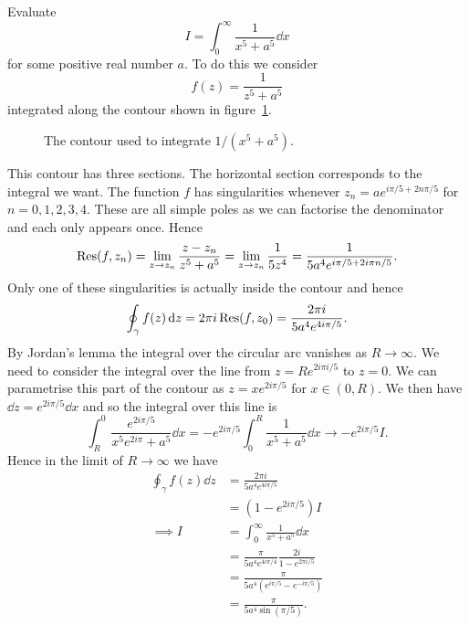 \documentclass{article}
\begin{document}
    Evaluate
    \[I = \int_{0}^{\infty} \frac{1}{x^5 + a^5}\dd{x}\]
    for some positive real number \(a\).
    To do this we consider
    \[f(z) = \frac{1}{z^5 + a^5}\]
    integrated along the contour shown in figure~\ref{fig:1/x^5 + a^5 contour}.
    \begin{figure}[ht]
        \centering
        \tikzexternalenable
        \tikzexternaldisable
        \caption{The contour used to integrate \(1/(x^5 + a^5)\).}
        \label{fig:1/x^5 + a^5 contour}
    \end{figure}
    This contour has three sections.
    The horizontal section corresponds to the integral we want.
    The function \(f\) has singularities whenever \(z_n = ae^{i\pi/5 + 2n\pi/5}\) for \(n = 0, 1, 2, 3, 4\).
    These are all simple poles as we can factorise the denominator and each only appears once.
    Hence
    \[\Res(f, z_n) = \lim_{z\to z_n} \frac{z - z_n}{z^5 + a^5} = \lim_{z\to z_n} \frac{1}{5z^4} = \frac{1}{5a^4e^{i\pi/5 + 2i\pi n/5}}.\]
    Only one of these singularities is actually inside the contour and hence
    \[\oint_{\gamma} f(z) \dd{z} = 2\pi i\Res(f, z_0) = \frac{2\pi i}{5a^4e^{4i\pi/5}}.\]
    By Jordan's lemma the integral over the circular arc vanishes as \(R\to\infty\).
    We need to consider the integral over the line from \(z = Re^{2i\pi i/5}\) to \(z = 0\).
    We can parametrise this part of the contour as \(z = xe^{2i\pi/5}\) for \(x \in (0, R)\).
    We then have \(\dd{z} = e^{2i\pi/5}\dd{x}\) and so the integral over this line is
    \[\int_{R}^{0} \frac{e^{2i\pi/5}}{x^5e^{2i\pi} + a^5}\dd{x} = -e^{2i\pi/5} \int_{0}^{R} \frac{1}{x^5 + a^5} \dd{x} \to -e^{2i\pi/5}I.\]
    Hence in the limit of \(R\to \infty\) we have
    \begin{align*}
        \oint_{\gamma} f(z) \dd{z} &= \frac{2\pi i}{5a^4 e^{4i\pi/5}}\\
        &= (1 - e^{2i\pi/5})I\\
        \implies I &= \int_{0}^{\infty} \frac{1}{x^5 + a^5} \dd{x}\\
        &= \frac{\pi}{5a^4e^{4i\pi/4}} \frac{2i}{1 - e^{2\pi i/5}}\\
        &= \frac{\pi}{5a^4 (e^{i\pi/5} - e^{-i\pi/5})}\\
        &= \frac{\pi}{5a^4\sin(\pi/5)}.
    \end{align*}
\end{document}
